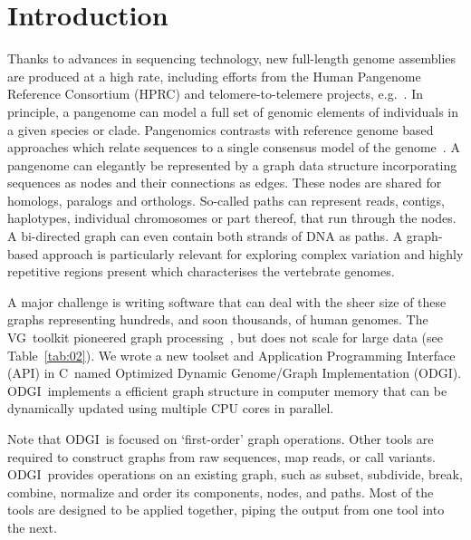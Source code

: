 \documentclass{bioinfo}
\newcommand{\odgi}{ODGI}
\newcommand{\vg}{VG}
\newcommand{\Rplus}{\protect\hspace{-.1em}\protect\raisebox{.35ex}{\smaller{\smaller\textbf{+}}}}
\newcommand{\Cpp}{\mbox{C\Rplus\Rplus}\xspace}
\begin{document}
    \section{Introduction}

    Thanks to advances in sequencing technology, new full-length
    genome assemblies are produced at a high rate, including
    efforts from the Human Pangenome Reference Consortium (HPRC) and
    telomere-to-telemere projects, e.g.~\citep{Miga:2020}. In
    principle, a pangenome can model a full set of genomic elements of
    individuals in a given species or clade. Pangenomics contrasts
    with reference genome based approaches which relate sequences to a
    single consensus model of the genome~\citep{Eizenga:2020}. A
    pangenome can elegantly be represented by a graph data structure
    incorporating sequences as nodes and their connections as
    edges. These nodes are shared for homologs, paralogs and
    orthologs. So-called paths can represent reads, contigs, haplotypes,
    individual chromosomes or part thereof, that run through the
    nodes. A bi-directed graph can even contain both strands of DNA
    as paths. A graph-based approach is particularly relevant for
    exploring complex variation and highly repetitive regions present
    which characterises the vertebrate genomes.

    A major challenge is writing software that can deal with the sheer
    size of these graphs representing hundreds, and soon thousands, of
    human genomes. The \vg\ toolkit pioneered graph
    processing~\citep{vgtools,Eizenga:2020b}, but does not scale for
    large data (see Table~\ref{tab:02}). We
    wrote a new toolset and Application Programming Interface (API)
    in \Cpp\ named Optimized Dynamic Genome/Graph Implementation (ODGI).
    \odgi\ implements a efficient graph structure in computer memory
    that can be dynamically updated using multiple CPU cores in parallel.

    Note that \odgi\ is focused on `first-order' graph
    operations. Other tools are required to construct graphs from raw
    sequences, map reads, or call variants. \odgi\ provides
    operations on an existing graph, such as subset, subdivide, break,
    combine, normalize and order its components, nodes, and
    paths. Most of the tools are designed to be applied together,
    piping the output from one tool into the next.


    
\end{document}
